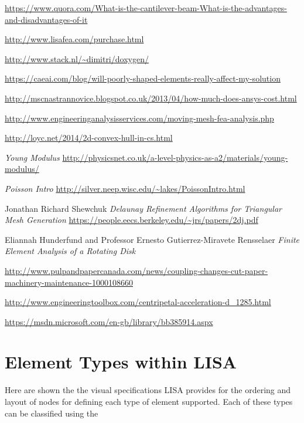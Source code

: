 \begin{changemargin}{\CMwidth}{\CMheight}
\begin{thebibliography}{9}
 \url{https://www.quora.com/What-is-the-cantilever-beam-What-is-the-advantages-and-disadvantages-of-it}

 \url{http://www.lisafea.com/purchase.html}

 \url{http://www.stack.nl/~dimitri/doxygen/} 

 \url{https://caeai.com/blog/will-poorly-shaped-elements-really-affect-my-solution}

 \url{http://mscnastrannovice.blogspot.co.uk/2013/04/how-much-does-ansys-cost.html}

 \url{http://www.engineeringanalysisservices.com/moving-mesh-fea-analysis.php}

 \url{http://loyc.net/2014/2d-convex-hull-in-cs.html}

 \emph{Young Modulus} \url{http://physicsnet.co.uk/a-level-physics-as-a2/materials/young-modulus/}

 \emph{Poisson Intro} \url{http://silver.neep.wisc.edu/~lakes/PoissonIntro.html}

 Jonathan Richard Shewchuk \emph{Delaunay Refinement Algorithms
for Triangular Mesh Generation} \url{https://people.eecs.berkeley.edu/~jrs/papers/2dj.pdf}

 Eliannah Hunderfund and Professor Ernesto Gutierrez-Miravete Rensselaer 
\emph{Finite Element Analysis of a Rotating Disk}


 \url{http://www.pulpandpapercanada.com/news/coupling-changes-cut-paper-machinery-maintenance-1000108660}

 \url{http://www.engineeringtoolbox.com/centripetal-acceleration-d_1285.html}

 \url{https://msdn.microsoft.com/en-gb/library/bb385914.aspx}


\end{thebibliography}
\end{changemargin}

\appendix

\section{Element Types within LISA}
Here are shown the the visual specifications LISA provides for the ordering and layout of nodes for defining each type of element supported. Each of these types can be classified using the 

